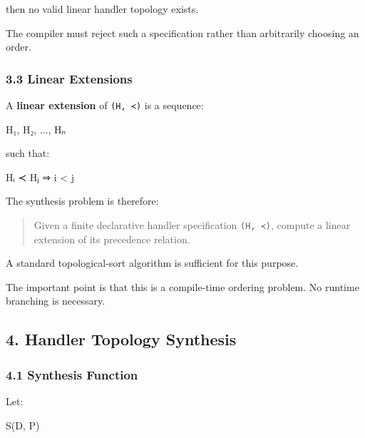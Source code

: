 \documentclass[
  11pt,
]{article}
\newenvironment{Shaded}{}{}
\newcommand{\NormalTok}[1]{#1}
\begin{document}
then no valid linear handler topology exists.

The compiler must reject such a specification rather than arbitrarily
choosing an order.

\subsubsection{3.3 Linear Extensions}\label{linear-extensions}

A \textbf{linear extension} of \texttt{(H,\ ≺)} is a sequence:

\begin{Shaded}
\begin{Highlighting}[]
\NormalTok{H₁, H₂, ..., Hₙ}
\end{Highlighting}
\end{Shaded}

such that:

\begin{Shaded}
\begin{Highlighting}[]
\NormalTok{Hᵢ ≺ Hⱼ ⇒ i \textless{} j}
\end{Highlighting}
\end{Shaded}

The synthesis problem is therefore:

\begin{quote}
Given a finite declarative handler specification \texttt{(H,\ ≺)},
compute a linear extension of its precedence relation.
\end{quote}

A standard topological-sort algorithm is sufficient for this purpose.

The important point is that this is a compile-time ordering problem. No
runtime branching is necessary.

\subsection{4. Handler Topology
Synthesis}\label{handler-topology-synthesis}

\subsubsection{4.1 Synthesis Function}\label{synthesis-function}

Let:

\begin{Shaded}
\begin{Highlighting}[]
\NormalTok{S(D, P)}
\end{Highlighting}
\end{Shaded}
\end{document}
